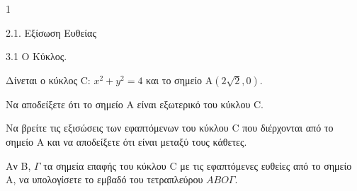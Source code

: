 \begin{ylh}{1}
    \item 2.1. Εξίσωση Ευθείας
    \item 3.1 Ο Κύκλος.
\end{ylh}
Δίνεται ο κύκλος C: $x^2 + y^2 = 4$ και το σημείο A$(2\sqrt{2}, 0)$.
\begin{alist}
\item
    \begin{rlist}
    \item Να αποδείξετε ότι το σημείο A είναι εξωτερικό του κύκλου C. 
    \item Να βρείτε τις εξισώσεις των εφαπτόμενων του κύκλου C που διέρχονται από το σημείο A και να αποδείξετε ότι είναι μεταξύ τους κάθετες. 
    \end{rlist}
\item Αν B, $\Gamma$ τα σημεία επαφής του κύκλου C με τις εφαπτόμενες ευθείες από το σημείο A, να υπολογίσετε το εμβαδό του τετραπλεύρου $ABO\Gamma$. 
\end{alist}